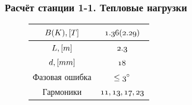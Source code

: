 \documentclass[14pt, hyperref = {colorlinks},xcolor=table ]{beamer}
\begin{document}
\iffalse
\small
\begin{frame}
\frametitle{Расчёт станции 1-1. Тепловые нагрузки}\label{t1}
\vspace{-10pt}
\begin{figure}[h]
		\hspace{-20pt}
		\begin{minipage}[h]{0.49\linewidth}
			\tiny
			\vspace{-10pt}		
			\begin{table}[h]
				\begin{tabular}{c|c}
					\hline\hline
					\rule{0pt}{3ex}$\mathnormal{B(K), [T]}$   & $\mathnormal{1.36(2.29)}$   \\ \hline
					\rule{0pt}{3ex}$\mathnormal{L, [m]}$ 	  & $\mathnormal{2.3}$          \\ \hline
					\rule{0pt}{3ex}$\mathnormal{d, [mm]}$     & $\mathnormal{18}$    		\\ \hline
					\rule{0pt}{3ex}Фазовая ошибка             &$ \mathnormal{\leq 3^{\circ}}$  \\ \hline
					\rule{0pt}{3ex}Гармоники	              & $\mathnormal{11, 13, 17, 23}$  \\
					\hline\hline
				\end{tabular}
			\end{table}
		\vspace{-10pt}	
\end{minipage}
\begin{minipage}[h]{0.49\linewidth}

\end{minipage}
\end{figure}
\end{frame}
\end{document}
